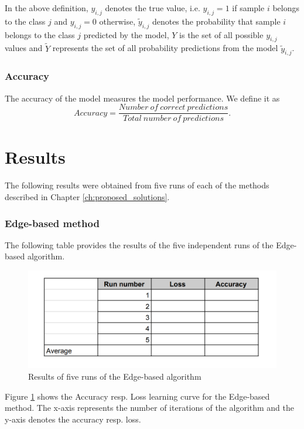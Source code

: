 In the above definition, $y_{i,j}$ denotes the true value, i.e. $y_{i,j}=1$ if sample $i$ belongs to the class $j$ and $y_{i,j}=0$ otherwise, $\tilde{y}_{i,j}$ denotes the probability that sample $i$ belongs to the class $j$ predicted by the model, $Y$ is the set of all possible $y_{i,j}$ values and $\tilde{Y}$ represents the set of all probability predictions from the model $\tilde{y}_{i,j}$.

\subsubsection{Accuracy}
The accuracy of the model measures the model performance. We define it as 
\begin{equation}
    Accuracy=\frac{Number\:of\:correct\:predictions }{Total\:number\:of\:predictions}.
\end{equation}

\section{Results}
The following results were obtained from five runs of each of the methods described in Chapter \ref{ch:proposed_solutions}.  
\subsubsection{Edge-based method}
The following table provides the results of the five independent runs of the Edge-based algorithm.

\begin{figure}[h!]
    \centering
    \includegraphics[scale=0.22]{figures/results.png}
    \caption{Results of five runs of the Edge-based algorithm}
    \label{fig:edge_based_met_results}
\end{figure}



Figure \ref{fig:edge_based_met_results} shows the Accuracy resp. Loss learning curve for the Edge-based method. The x-axis represents the number of iterations of the algorithm and the y-axis denotes the accuracy resp. loss.

